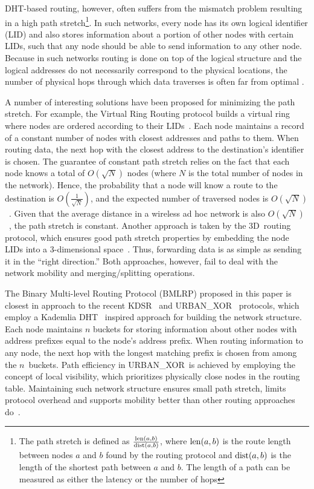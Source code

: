 \documentclass[conference]{IEEEtran}
\theoremstyle{definition}
\newcommand{\urbanxor}{URBAN\_XOR}
\begin{document}
DHT-based routing, however, often suffers from the mismatch problem resulting in a high path stretch\footnote{The path stretch is defined as $ \frac{{\rm len}(a,b)}{{\rm dist}(a,b)} $, where ${\rm len}(a,b)$ is the route length between nodes $a$ and $b$ found by the routing protocol and ${\rm dist}(a,b)$ is the length of the shortest path between $a$ and $b$. The length of a path can be measured as either the latency or the number of hops}. In such networks, every node has its own logical identifier (LID) and also stores information about a portion of other nodes with certain LIDs, such that any node should be able to send information to any other node. Because in such networks routing is done on top of the logical structure and the logical addresses do not necessarily correspond to the physical locations, the number of physical hops through which data traverses is often far from optimal \cite{Abid}.

A number of interesting solutions have been proposed for minimizing the path stretch. For example, the Virtual Ring Routing protocol builds a virtual ring where nodes are ordered according to their LIDs~\cite{VRR}. Each node maintains a record of a constant number of nodes with closest addresses and paths to them. When routing data, the next hop with the closest address to the destination's identifier is chosen. The guarantee of constant path stretch relies on the fact that each node knows a total of $O(\sqrt{N})$ nodes (where $N$ is the total number of nodes in the network). Hence, the probability that a node will know a route to the destination is $O(\frac{1}{\sqrt{N}})$, and the expected number of traversed nodes is $O(\sqrt{N})$~\cite{VRR}. Given that the average distance in a wireless ad hoc network is also $O(\sqrt{N})$~\cite{Kleinrock}, the path stretch is constant. Another approach is taken by the 3D~routing protocol, which ensures good path stretch properties by embedding the node LIDs into a 3-dimensional space~\cite{3drp}. Thus, forwarding data is as simple as sending it in the ``right direction.'' Both approaches, however, fail to deal with the network mobility and merging/splitting operations. 

The Binary Multi-level Routing Protocol (BMLRP) proposed in this paper is closest in approach to the recent KDSR~\cite{kdsr} and \urbanxor~\cite{Pasquini} protocols, which employ a Kademlia DHT~\cite{kademlia} inspired approach for building the network structure. Each node maintains $n$ buckets for storing information about other nodes with address prefixes equal to the node's address prefix. When routing information to any node, the next hop with the longest matching prefix is chosen from among the $n$~buckets. Path efficiency in \urbanxor~is achieved by employing the concept of local visibility, which prioritizes physically close nodes in the routing table. Maintaining such network structure ensures small path stretch, limits protocol overhead and supports mobility better than other routing approaches do~\cite{urbanxor}.
\end{document}

